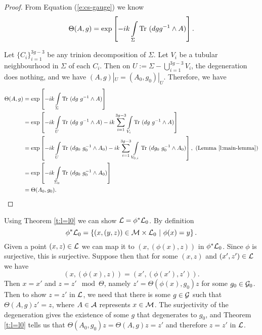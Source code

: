 	\begin{proof}
		From Equation (\ref{e:cs-gauge}) we know
		\begin{equation}
			\Theta(A,g) = \exp\left[-ik\int\limits_\Sigma \text{Tr }(dg g^{-1}\wedge A)\right].
		\end{equation}
		
		Let $\{C_i\}_{i=1}^{3g-3}$ be any trinion decomposition of $\Sigma$. Let $V_i$ be a tubular neighbourhood in $\Sigma$ of each $C_i$. Then on $U:= \Sigma - \bigcup_{i=1}^{3g-3}V_i$, the degeneration does nothing, and we have $(A,g)|_U = (A_0,g_0)|_U$. Therefore, we have
		\begin{align*}
				\Theta(A,g) &= \exp\left[-ik\int\limits_\Sigma \text{Tr }(dg~ g^{-1}\wedge A)\right]\\
				&= \exp\left[-ik\int\limits_U \text{Tr }(dg~g^{-1}\wedge A)
				-ik \sum_{i=1}^{3g-3}\int\limits_{V_i} \text{Tr }(dg~g^{-1}\wedge A)\right]\\
				&= \exp\left[-ik\int\limits_U \text{Tr }(dg_0~g_0^{-1}\wedge A_0)
				-ik \sum_{i=1}^{3g-3}\int\limits_{V_{0,i}} \text{Tr }(dg_0~g_0^{-1}\wedge A_0)\right],~ (\text{Lemma } \ref{l:main-lemma})\\
				&= \exp\left[-ik\int\limits_{\Sigma_0} \text{Tr }(dg_0~ g_0^{-1}\wedge A_0)\right]\\
				&= \Theta(A_0,g_0).
		\end{align*}
	\end{proof}
	Using Theorem \ref{t:l=l0} we can show $\mathcal{L} = \phi^\ast \mathcal{L}_0$. By definition
	\begin{equation}
	\phi^\ast \mathcal{L}_0 = \left\{
	(x,(y,z)) \in \mathcal{M}\times\mathcal{L}_0  ~|~ \phi(x) = y 		
	\right\}.
	\end{equation}
	Given a point $(x,z) \in \mathcal{L}$ we can map it to $(x, (\phi(x),z))$ in $\phi^\ast \mathcal{L}_0$. Since $\phi$ is surjective, this is surjective. Suppose then that for some $(x,z)$ and $(x',z') \in \mathcal{L}$ we have
	\begin{equation}
	(x, (\phi(x), z)) = (x', (\phi(x'), z')).
	\end{equation}
	Then $x=x'$ and $z = z' \mod \Theta$, namely $z' = \Theta(\phi(x), g_0)z$ for some $g_0 \in \mathcal{G}_0$. Then to show $z=z'$ in $\mathcal{L}$, we need that there is some $g\in \mathcal{G}$ such that $\Theta(A,g)z' = z$, where $A\in \mathcal{A}$ represents $x\in \mathcal{M}$. The surjectivity of the degeneration gives the existence of some $g$ that degenerates to $g_0$, and Theorem \ref{t:l=l0} tells us that $\Theta(A_0, g_0)z = \Theta(A,g)z = z'$ and therefore $z=z'$ in $\mathcal{L}$. 
	
